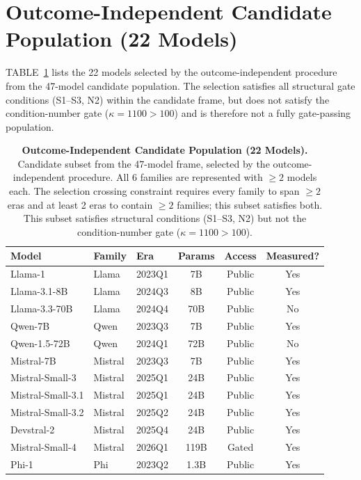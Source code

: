 \documentclass{ieeeaccess}
\theoremstyle{definition}
\theoremstyle{plain}
\begin{document}
\section{Outcome-Independent Candidate Population (22 Models)}
\label{app:22model}
TABLE~\ref{tab:22model} lists the 22 models selected by the outcome-independent procedure from the 47-model candidate population. The selection satisfies all structural gate conditions (S1--S3, N2) within the candidate frame, but does not satisfy the condition-number gate ($\kappa = 1100 > 100$) and is therefore not a fully gate-passing population.

\begin{table}[!t]
\caption{\textbf{Outcome-Independent Candidate Population (22 Models).} Candidate subset from the 47-model frame, selected by the outcome-independent procedure. All 6 families are represented with $\geq 2$ models each. The selection crossing constraint requires every family to span $\geq 2$ eras and at least 2 eras to contain $\geq 2$ families; this subset satisfies both. This subset satisfies structural conditions (S1--S3, N2) but not the condition-number gate ($\kappa = 1100 > 100$).}
\label{tab:22model}
\centering
\footnotesize
\begin{tabular}{l l l c c c}
\hline
\textbf{Model} & \textbf{Family} & \textbf{Era} & \textbf{Params} & \textbf{Access} & \textbf{Measured?} \\
\hline
Llama-1 & Llama & 2023Q1 & 7B & Public & Yes \\
\hline
Llama-3.1-8B & Llama & 2024Q3 & 8B & Public & Yes \\
\hline
Llama-3.3-70B & Llama & 2024Q4 & 70B & Public & No \\
\hline
Qwen-7B & Qwen & 2023Q3 & 7B & Public & Yes \\
\hline
Qwen-1.5-72B & Qwen & 2024Q1 & 72B & Public & No \\
\hline
Mistral-7B & Mistral & 2023Q3 & 7B & Public & Yes \\
\hline
Mistral-Small-3 & Mistral & 2025Q1 & 24B & Public & Yes \\
\hline
Mistral-Small-3.1 & Mistral & 2025Q1 & 24B & Public & Yes \\
\hline
Mistral-Small-3.2 & Mistral & 2025Q2 & 24B & Public & Yes \\
\hline
Devstral-2 & Mistral & 2025Q4 & 24B & Public & Yes \\
\hline
Mistral-Small-4 & Mistral & 2026Q1 & 119B & Gated & Yes \\
\hline
Phi-1 & Phi & 2023Q2 & 1.3B & Public & Yes \\

\end{tabular}
\end{table}
\end{document}
